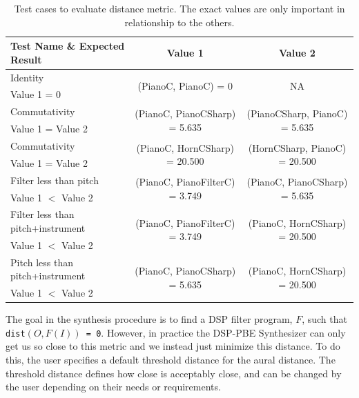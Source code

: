 \begin{table}[!h]
\centering
\caption{Test cases to evaluate distance metric. The exact values are only important in relationship to the others.}
\begin{tabular}{|l | c | c|} 
 \hline
 Test Name \& Expected Result & Value 1 & Value 2 \\
 \hline
 \hline
 Identity & \multirow{2}{*}{(PianoC, PianoC) = 0} & \multirow{2}{*}{NA}\\ 
   \quad Value 1 = 0 &  & \\
 \hline
 Commutativity & \multirow{2}{*}{(PianoC, PianoCSharp) = 5.635} & \multirow{2}{*}{(PianoCSharp, PianoC) = 5.635} \\
   \quad Value 1 = Value 2  & & \\
 \hline
 Commutativity & \multirow{2}{*}{(PianoC, HornCSharp) = 20.500} & \multirow{2}{*}{(HornCSharp, PianoC) = 20.500} \\
   \quad  Value 1 = Value 2 & & \\
 \hline
 Filter less than pitch & \multirow{2}{*}{(PianoC, PianoFilterC) = 3.749} & \multirow{2}{*}{(PianoC, PianoCSharp) = 5.635} \\ 
   \quad Value 1 $<$ Value 2 & & \\
 \hline
 Filter less than pitch+instrument & \multirow{2}{*}{(PianoC, PianoFilterC) = 3.749} & \multirow{2}{*}{(PianoC, HornCSharp) = 20.500} \\
   \quad Value 1 $<$ Value 2 & & \\
 \hline
 Pitch less than pitch+instrument & \multirow{2}{*}{(PianoC, PianoCSharp) = 5.635} & \multirow{2}{*}{(PianoC, HornCSharp) = 20.500} \\
   \quad Value 1 $<$ Value 2 & & \\
 \hline
\end{tabular}
\label{table:dist}
\end{table}


The goal in the synthesis procedure is to find a DSP filter program, $F$, such that \texttt{dist$(O, F(I))$ = 0}.
However, in practice the DSP-PBE Synthesizer can only get us so close to this metric and we instead just minimize this distance.
To do this, the user specifies a default threshold distance for the aural distance.
The threshold distance defines how close is acceptably close, and can be changed by the user depending on their needs or requirements.

